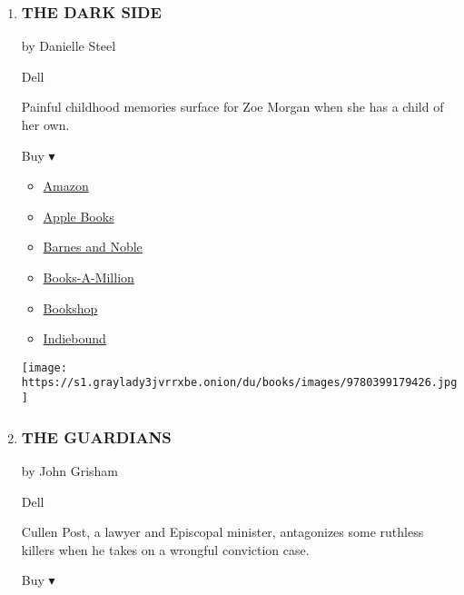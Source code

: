 \begin{enumerate}
\def\labelenumi{\arabic{enumi}.}
\item
  \hypertarget{the-dark-side}{%
  \subsubsection{THE DARK SIDE}\label{the-dark-side}}

  by Danielle Steel

  Dell

  Painful childhood memories surface for Zoe Morgan when she has a child
  of her own.

  Buy ▾

  \begin{itemize}
  \tightlist
  \item
    \href{https://www.amazon.com/Dark-Side-Novel-Danielle-Steel-ebook/dp/B07L2GTK7J?tag=NYTBS-20}{Amazon}
  \item
    \href{https://du-gae-books-dot-nyt-du-prd.appspot.com/buy?title=THE+DARK+SIDE\&author=Danielle+Steel}{Apple
    Books}
  \item
    \href{https://www.anrdoezrs.net/click-7990613-11819508?url=https\%3A\%2F\%2Fwww.barnesandnoble.com\%2Fw\%2F\%3Fean\%3D9780399179433}{Barnes
    and Noble}
  \item
    \href{https://www.anrdoezrs.net/click-7990613-35140?url=https\%3A\%2F\%2Fwww.booksamillion.com\%2Fp\%2FTHE\%2BDARK\%2BSIDE\%2FDanielle\%2BSteel\%2F9780399179433}{Books-A-Million}
  \item
    \href{https://bookshop.org/a/3546/9780399179433}{Bookshop}
  \item
    \href{https://www.indiebound.org/book/9780399179433?aff=NYT}{Indiebound}
  \end{itemize}

  \texttt{[image: https://s1.graylady3jvrrxbe.onion/du/books/images/9780399179426.jpg]}
\item
  \hypertarget{the-guardians}{%
  \subsubsection{THE GUARDIANS}\label{the-guardians}}

  by John Grisham

  Dell

  Cullen Post, a lawyer and Episcopal minister, antagonizes some
  ruthless killers when he takes on a wrongful conviction case.

  Buy ▾


\end{enumerate}
